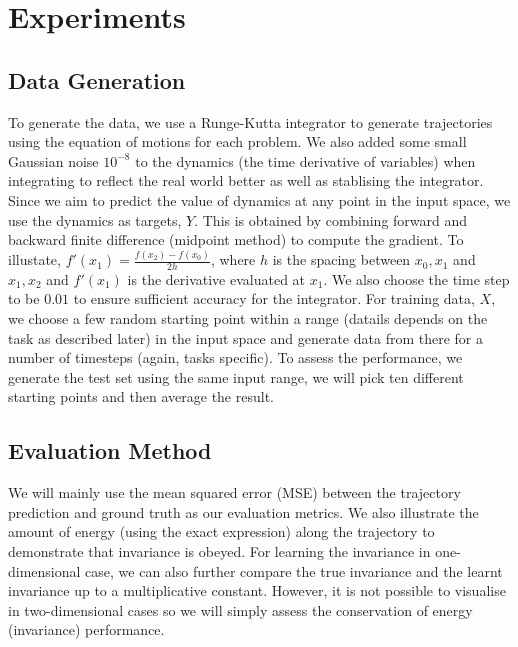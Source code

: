 \documentclass{statsmsc}
\begin{document}
\chapter{Experiments}
\section{Data Generation}
To generate the data, we use a Runge-Kutta integrator to generate trajectories using the equation of motions for each problem. 
We also added some small Gaussian noise $10^{-8}$ to the dynamics (the time derivative of variables) when integrating to reflect the real world better as well as stablising the integrator.
Since we aim to predict the value of dynamics at any point in the input space, we use the dynamics as targets, $Y$. 
This is obtained by combining forward and backward finite difference (midpoint method) to compute the gradient. 
To illustate, $f'(x_1)=\frac{f(x_2)-f(x_0)}{2h}$, where $h$ is the spacing between $x_0, x_1$ and $x_1, x_2$ and $f'(x_1)$ is the derivative evaluated at $x_1$.
We also choose the time step to be $0.01$ to ensure sufficient accuracy for the integrator.
For training data, $X$, we choose a few random starting point within a range (datails depends on the task as described later) in the input space and generate data from there for a number of timesteps (again, tasks specific). 
To assess the performance, we generate the test set using the same input range, we will pick ten different starting points and then average the result.

\section{Evaluation Method}
We will mainly use the mean squared error (MSE) between the trajectory prediction and ground truth as our evaluation metrics. 
We also illustrate the amount of energy (using the exact expression) along the trajectory to demonstrate that invariance is obeyed.
For learning the invariance in one-dimensional case, we can also further compare the true invariance and the learnt invariance up to a multiplicative constant.
However, it is not possible to visualise in two-dimensional cases so we will simply assess the conservation of energy (invariance) performance.
\end{document}
